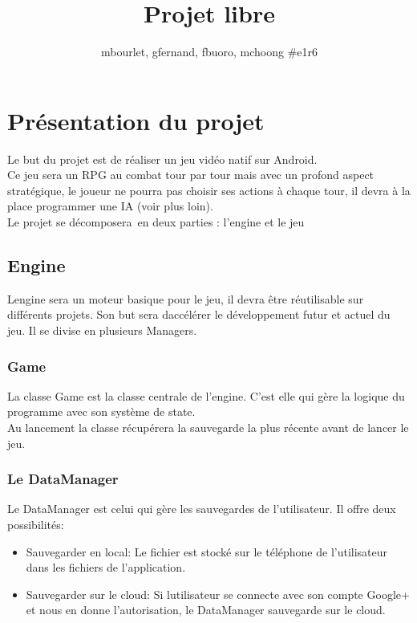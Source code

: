 \documentclass[16pt, oneside]{report}
\title{{\myfont Projet libre}}
\author{mbourlet, gfernand, fbuoro, mchoong \#e1r6}
\date{}
\begin{document}
\maketitle

\chapter{Pr\'esentation du projet}
Le but du projet est de r\'ealiser un jeu vid\'eo natif sur Android.\\
Ce jeu sera un RPG au combat tour par tour mais avec un profond aspect strat\'egique, le joueur ne pourra pas choisir ses actions \`a chaque tour, il devra \`a la place programmer une IA (voir plus loin).\\
Le projet se d\'ecomposera\ en deux parties : l'engine et le jeu

\section{Engine}
L\textquotesingle engine sera un moteur basique pour le jeu, il devra \^etre r\'eutilisable sur diff\'erents projets. Son but sera d\textquotesingle acc\'el\'erer le d\'eveloppement futur et actuel du jeu. Il se divise en plusieurs Managers.

\subsection{Game}
La classe Game est la classe centrale de l'engine. C'est elle qui g\`ere la logique du programme avec son syst\`eme de state.\\
Au lancement la classe r\'ecup\'erera la sauvegarde la plus r\'ecente avant de lancer le jeu.

\subsection{Le DataManager}
Le DataManager est celui qui g\`ere les sauvegardes de l'utilisateur. Il offre deux possibilit\'es:
\begin{itemize}
	\item Sauvegarder en local: Le fichier est stock\'e sur le t\'el\'ephone de l'utilisateur dans les fichiers de l'application.
	\item Sauvegarder sur le cloud: Si l\textquotesingle utilisateur se connecte avec son compte Google+ et nous en donne l'autorisation, le DataManager sauvegarde sur le cloud.\\
\end{itemize}
\end{document}
